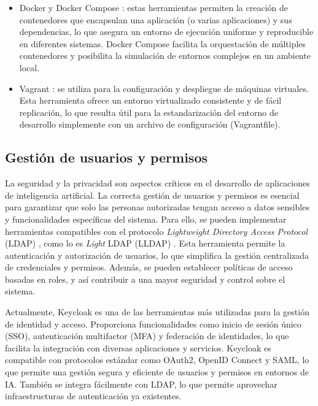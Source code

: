 \begin{itemize}
	\item Docker y Docker Compose \citep{merkel_docker_2014} \citep{docker_docker_0000}: estas herramientas permiten la creación de contenedores que encapsulan una aplicación (o varias aplicaciones) y sus dependencias, lo que asegura un entorno de ejecución uniforme y reproducible en diferentes sistemas. Docker Compose facilita la orquestación de múltiples contenedores y posibilita la simulación de entornos complejos en un ambiente local.
	\item Vagrant \citep{hashicorp_vagrant_2023} \citep{hashicorp_documentation_nodate}: se utiliza para la configuración y despliegue de máquinas virtuales. Esta herramienta ofrece un entorno virtualizado consistente y de fácil replicación, lo que resulta útil para la estandarización del entorno de desarrollo simplemente con un archivo de configuración (Vagrantfile).
\end{itemize}

\subsection{Gestión de usuarios y permisos}

La seguridad y la privacidad son aspectos críticos en el desarrollo de aplicaciones de inteligencia artificial. La correcta gestión de usuarios y permisos es esencial para garantizar que solo las personas autorizadas tengan acceso a datos sensibles y funcionalidades específicas del sistema. Para ello, se pueden implementar herramientas compatibles con el protocolo \textit{Lightweight Directory Access Protocol} (LDAP) \citep{wikipedia_protocolo_2024}, como lo es \textit{Light} LDAP (LLDAP) \citep{lldap_authors_lldap_2023}. Esta herramienta permite la autenticación y autorización de usuarios, lo que simplifica la gestión centralizada de credenciales y permisos. Además, se pueden establecer políticas de acceso basadas en roles, y así contribuir a una mayor seguridad y control sobre el sistema.

Actualmente, Keycloak \citep{cloud_native_computing_foundation_keycloak_nodate} es una de las herramientas más utilizadas para la gestión de identidad y acceso. Proporciona funcionalidades como inicio de sesión único (SSO), autenticación multifactor (MFA) y federación de identidades, lo que facilita la integración con diversas aplicaciones y servicios. Keycloak es compatible con protocolos estándar como OAuth2, OpenID Connect y SAML, lo que permite una gestión segura y eficiente de usuarios y permisos en entornos de IA. También se integra fácilmente con LDAP, lo que permite aprovechar infraestructuras de autenticación ya existentes.


